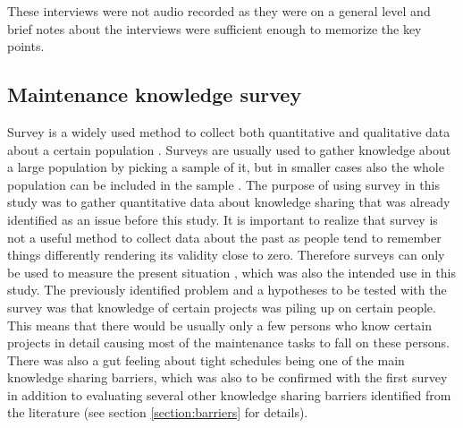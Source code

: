 These interviews were not audio recorded as they were on a general level and brief notes about the interviews were sufficient enough to memorize the key points.

\subsection{Maintenance knowledge survey}
\label{subsection:survey}

Survey is a widely used method to collect both quantitative and qualitative data about a certain population \citep{Easterbrook2008}. Surveys are usually used to gather knowledge
about a large population by picking a sample of it, but in smaller cases also the whole population can be included in the sample \citep{Kasunic2005}. The purpose of using
survey in this study was to gather quantitative data about knowledge sharing that was already identified as an issue before this study. It is important
to realize that survey is not a useful method to collect data about the past as people tend to remember things differently rendering its validity close to zero.
Therefore surveys can only be used to measure the present situation \citep{Linaker2015}, which was also the intended use in this study. The previously identified
problem and a hypotheses to be tested with the survey was that knowledge of certain projects was piling up on certain people. This means that there would be usually only a few persons
who know certain projects in detail causing most of the maintenance tasks to fall on these persons. There was also a gut feeling about tight schedules being one of the main
knowledge sharing barriers, which was also to be confirmed with the first survey in addition to evaluating several other knowledge sharing barriers identified from the
literature (see section \ref{section:barriers} for details).

